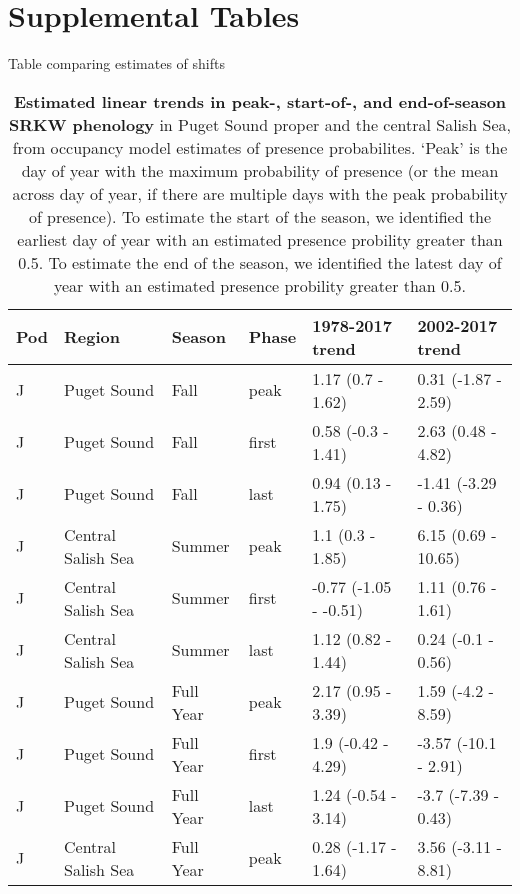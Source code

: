 \documentclass{article}
\begin{document}
\section* {Supplemental Tables}
\par Table comparing estimates of shifts
\begin{table}[ht]
\centering
\caption{\textbf{Estimated linear trends in peak-, start-of-, and end-of-season SRKW phenology} in Puget Sound proper and the central Salish Sea, from occupancy model estimates of presence probabilites. `Peak' is the day of year with the maximum probability of presence (or the mean across day of year, if there are multiple days with the peak probability of presence). To estimate the start of the season, we identified the earliest day of year with an estimated presence probility greater than 0.5. To estimate the end of the season, we identified the latest day of year with an estimated presence probility greater than 0.5.} 
\label{tab:modsz}
\begingroup\footnotesize
\begin{tabular}{|p{}|p{}|p{}|p{}|p{}|p{}|}
  \hline
Pod & Region & Season & Phase & 1978-2017 trend & 2002-2017 trend \\ 
  \hline
J & Puget Sound & Fall & peak & 1.17 (0.7 - 1.62) & 0.31 (-1.87 - 2.59) \\ 
  J & Puget Sound & Fall & first & 0.58 (-0.3 - 1.41) & 2.63 (0.48 - 4.82) \\ 
  J & Puget Sound & Fall & last & 0.94 (0.13 - 1.75) & -1.41 (-3.29 - 0.36) \\ 
  J & Central Salish Sea & Summer & peak & 1.1 (0.3 - 1.85) & 6.15 (0.69 - 10.65) \\ 
  J & Central Salish Sea & Summer & first & -0.77 (-1.05 - -0.51) & 1.11 (0.76 - 1.61) \\ 
  J & Central Salish Sea & Summer & last & 1.12 (0.82 - 1.44) & 0.24 (-0.1 - 0.56) \\ 
  J & Puget Sound & Full Year & peak & 2.17 (0.95 - 3.39) & 1.59 (-4.2 - 8.59) \\ 
  J & Puget Sound & Full Year & first & 1.9 (-0.42 - 4.29) & -3.57 (-10.1 - 2.91) \\ 
  J & Puget Sound & Full Year & last & 1.24 (-0.54 - 3.14) & -3.7 (-7.39 - 0.43) \\ 
  J & Central Salish Sea & Full Year & peak & 0.28 (-1.17 - 1.64) & 3.56 (-3.11 - 8.81) \\ 

\end{tabular}
\end{table}
\end{document}
